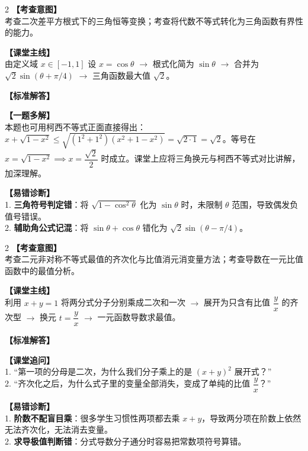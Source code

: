 \documentclass[12pt,a4paper]{ctexart}
\begin{document}
\begin{paracol}{2}
  \textbf{【考查意图】}\\
  考查二次差平方根式下的三角恒等变换；考查将代数不等式转化为三角函数有界性的能力。
  
  \textbf{【课堂主线】}\\
  由定义域 \(x \in [-1,1]\) 设 \(x = \cos\theta\) \(\to\) 根式化简为 \(\sin\theta\) \(\to\) 合并为 \(\sqrt{2}\sin(\theta+\pi/4)\) \(\to\) 三角函数最大值 \(\sqrt{2}\)。
  
  \textbf{【标准解答】}\\
  \qTwoSolution
  
  \textbf{【一题多解】}\\
  本题也可用柯西不等式正面直接得出：\\
  \(x + \sqrt{1-x^2} \leqslant \sqrt{(1^2+1^2)(x^2+1-x^2)} = \sqrt{2 \cdot 1} = \sqrt{2}\)。等号在 \(x = \sqrt{1-x^2} \implies x = \dfrac{\sqrt{2}}{2}\) 时成立。课堂上应将三角换元与柯西不等式对比讲解，加深理解。

  \switchcolumn
  \textbf{【易错诊断】}\\
  1. \textbf{三角符号判定错}：将 \(\sqrt{1-\cos^2\theta}\) 化为 \(\sin\theta\) 时，未限制 \(\theta\) 范围，导致偶发负值号错误。\\
  2. \textbf{辅助角公式记混}：将 \(\sin\theta+\cos\theta\) 错化为 \(\sqrt{2}\sin(\theta-\pi/4)\)。
\end{paracol}

\vspace{0.8em}
\par{}
\vspace{0.8em}

\newpage

\qThreeStem
\qThreeOptions

\begin{paracol}{2}
  \textbf{【考查意图】}\\
  考查二元非对称不等式最值的齐次化与比值消元消变量方法；考查导数在一元比值函数中的最值分析。
  
  \textbf{【课堂主线】}\\
  利用 \(x+y=1\) 将两分式分子分别乘成二次和一次 \(\to\) 展开为只含有比值 \(\dfrac{y}{x}\) 的齐次型 \(\to\) 换元 \(t = \dfrac{y}{x}\) \(\to\) 一元函数导数求最值。
  
  \textbf{【标准解答】}\\
  \qThreeSolution
  
  \textbf{【课堂追问】}\\
  1. “第一项的分母是二次，为什么我们分子乘上的是 \((x+y)^2\) 展开式？”\\
  2. “齐次化之后，为什么式子里的变量全部消失，变成了单纯的比值 \(\dfrac{y}{x}\)？”
  
  \switchcolumn
  \textbf{【易错诊断】}\\
  1. \textbf{阶数不配盲目乘}：很多学生习惯性两项都去乘 \(x+y\)，导致两分项在阶数上依然无法齐次化，无法消去变量。\\
  2. \textbf{求导极值判断错}：分式导数分子通分时容易把常数项符号算错。
\end{paracol}
\end{document}
